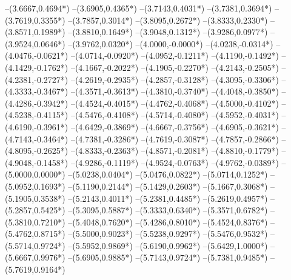 {	--(3.6667,{0.4694*\yskala})
	--(3.6905,{0.4365*\yskala})
	--(3.7143,{0.4031*\yskala})
	--(3.7381,{0.3694*\yskala})
	--(3.7619,{0.3355*\yskala})
	--(3.7857,{0.3014*\yskala})
	--(3.8095,{0.2672*\yskala})
	--(3.8333,{0.2330*\yskala})
	--(3.8571,{0.1989*\yskala})
	--(3.8810,{0.1649*\yskala})
	--(3.9048,{0.1312*\yskala})
	--(3.9286,{0.0977*\yskala})
	--(3.9524,{0.0646*\yskala})
	--(3.9762,{0.0320*\yskala})
	--(4.0000,{-0.0000*\yskala})
	--(4.0238,{-0.0314*\yskala})
	--(4.0476,{-0.0621*\yskala})
	--(4.0714,{-0.0920*\yskala})
	--(4.0952,{-0.1211*\yskala})
	--(4.1190,{-0.1492*\yskala})
	--(4.1429,{-0.1762*\yskala})
	--(4.1667,{-0.2022*\yskala})
	--(4.1905,{-0.2270*\yskala})
	--(4.2143,{-0.2505*\yskala})
	--(4.2381,{-0.2727*\yskala})
	--(4.2619,{-0.2935*\yskala})
	--(4.2857,{-0.3128*\yskala})
	--(4.3095,{-0.3306*\yskala})
	--(4.3333,{-0.3467*\yskala})
	--(4.3571,{-0.3613*\yskala})
	--(4.3810,{-0.3740*\yskala})
	--(4.4048,{-0.3850*\yskala})
	--(4.4286,{-0.3942*\yskala})
	--(4.4524,{-0.4015*\yskala})
	--(4.4762,{-0.4068*\yskala})
	--(4.5000,{-0.4102*\yskala})
	--(4.5238,{-0.4115*\yskala})
	--(4.5476,{-0.4108*\yskala})
	--(4.5714,{-0.4080*\yskala})
	--(4.5952,{-0.4031*\yskala})
	--(4.6190,{-0.3961*\yskala})
	--(4.6429,{-0.3869*\yskala})
	--(4.6667,{-0.3756*\yskala})
	--(4.6905,{-0.3621*\yskala})
	--(4.7143,{-0.3464*\yskala})
	--(4.7381,{-0.3286*\yskala})
	--(4.7619,{-0.3087*\yskala})
	--(4.7857,{-0.2866*\yskala})
	--(4.8095,{-0.2625*\yskala})
	--(4.8333,{-0.2363*\yskala})
	--(4.8571,{-0.2081*\yskala})
	--(4.8810,{-0.1779*\yskala})
	--(4.9048,{-0.1458*\yskala})
	--(4.9286,{-0.1119*\yskala})
	--(4.9524,{-0.0763*\yskala})
	--(4.9762,{-0.0389*\yskala})
	--(5.0000,{0.0000*\yskala})
	--(5.0238,{0.0404*\yskala})
	--(5.0476,{0.0822*\yskala})
	--(5.0714,{0.1252*\yskala})
	--(5.0952,{0.1693*\yskala})
	--(5.1190,{0.2144*\yskala})
	--(5.1429,{0.2603*\yskala})
	--(5.1667,{0.3068*\yskala})
	--(5.1905,{0.3538*\yskala})
	--(5.2143,{0.4011*\yskala})
	--(5.2381,{0.4485*\yskala})
	--(5.2619,{0.4957*\yskala})
	--(5.2857,{0.5425*\yskala})
	--(5.3095,{0.5887*\yskala})
	--(5.3333,{0.6340*\yskala})
	--(5.3571,{0.6782*\yskala})
	--(5.3810,{0.7210*\yskala})
	--(5.4048,{0.7620*\yskala})
	--(5.4286,{0.8010*\yskala})
	--(5.4524,{0.8376*\yskala})
	--(5.4762,{0.8715*\yskala})
	--(5.5000,{0.9023*\yskala})
	--(5.5238,{0.9297*\yskala})
	--(5.5476,{0.9532*\yskala})
	--(5.5714,{0.9724*\yskala})
	--(5.5952,{0.9869*\yskala})
	--(5.6190,{0.9962*\yskala})
	--(5.6429,{1.0000*\yskala})
	--(5.6667,{0.9976*\yskala})
	--(5.6905,{0.9885*\yskala})
	--(5.7143,{0.9724*\yskala})
	--(5.7381,{0.9485*\yskala})
	--(5.7619,{0.9164*\yskala})
}
